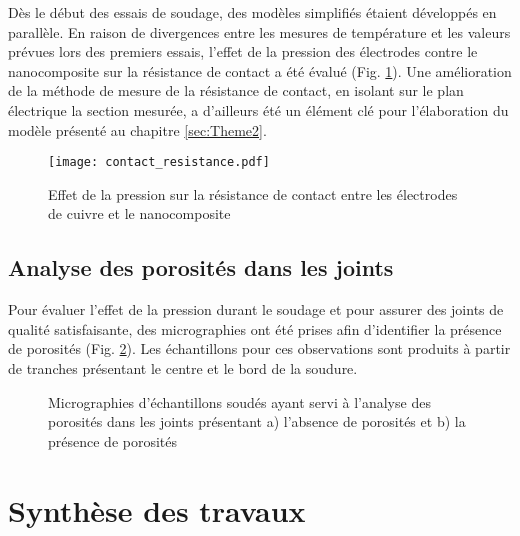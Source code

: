 Dès le début des essais de soudage, des modèles simplifiés étaient développés en parallèle. 
En raison de divergences entre les mesures de température et les valeurs prévues lors des premiers essais, l'effet de la pression des électrodes contre le nanocomposite sur la résistance de contact a été évalué (Fig. \ref{fig:resistance_contact}). 
Une amélioration de la méthode de mesure de la résistance de contact, en isolant sur le plan électrique la section mesurée, a d'ailleurs été un élément clé pour l'élaboration du modèle présenté au chapitre \ref{sec:Theme2}. 

\begin{figure}[h]
	\centering
	\texttt{[image: contact\_resistance.pdf]}
	\caption{Effet de la pression sur la résistance de contact entre les électrodes de cuivre et le nanocomposite}
	\label{fig:resistance_contact}
\end{figure}

\FloatBarrier
\subsection{Analyse des porosités dans les joints}

Pour évaluer l'effet de la pression durant le soudage et pour assurer des joints de qualité satisfaisante, des micrographies ont été prises afin d'identifier la présence de porosités (Fig. \ref{fig:micro_analyse_porosite}). 
Les échantillons pour ces observations sont produits à partir de tranches présentant le centre et le bord de la soudure. 

\begin{figure}[h!]
	\centering
	 \qquad
	\caption{Micrographies d'échantillons soudés ayant servi à l'analyse des porosités dans les joints présentant a) l'absence de porosités et b) la présence de porosités}
	\label{fig:micro_analyse_porosite}
\end{figure}

\FloatBarrier
\section{Synthèse des travaux}

